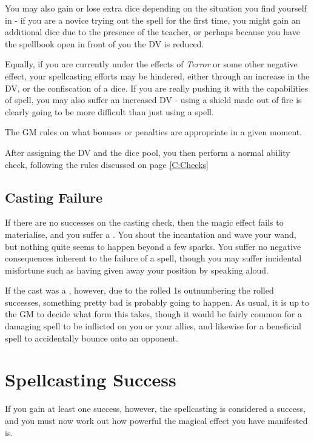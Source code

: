 You may also gain or lose extra dice depending on the situation you find yourself in - if you are a novice trying out the spell for the first time, you might gain an additional dice due to the presence of the teacher, or perhaps because you have the spellbook open in front of you the DV is reduced. 

Equally, if you are currently under the effects of {\it Terror} or some other negative effect, your spellcasting efforts may be hindered, either through an increase in the DV, or the confiscation of a dice. If you are really pushing it with the capabilities of spell, you may also suffer an increased DV - using a shield made out of fire is clearly going to be more difficult than just using a  spell. 

The GM rules on what bonuses or penalties are appropriate in a given moment. 

After assigning the DV and the dice pool, you then perform a normal ability check, following the rules discussed on page \ref{C:Checks}

\subsection{Casting Failure}

If there are no successes on the casting check, then the magic effect fails to materialise, and you suffer a . You shout the incantation and wave your wand, but nothing quite seems to happen beyond a few sparks. You suffer no negative consequences inherent to the failure of a spell, though you may suffer incidental misfortune such as having given away your position by speaking aloud. 

If the cast was a , however, due to the rolled 1s outnumbering the rolled successes, something pretty bad is probably going to happen. As usual, it is up to the GM to decide what form this takes, though it would be fairly common for a damaging spell to be inflicted on you or your allies, and likewise for a beneficial spell to accidentally bounce onto an opponent. 



\section{Spellcasting Success}

If you gain at least one success, however, the spellcasting is considered a success, and you must now work out how powerful the magical effect you have manifested is. 


